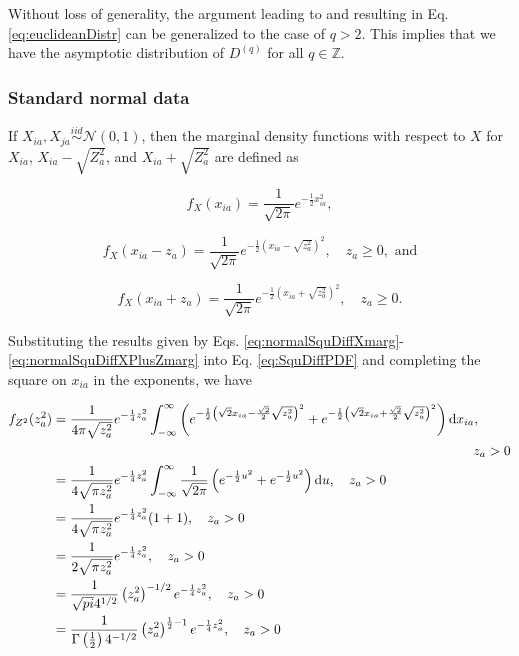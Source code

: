 \documentclass[10pt,letterpaper]{article}\usepackage[]{graphicx}\usepackage[]{color}
\begin{document}
Without loss of generality, the argument leading to and resulting in Eq. \ref{eq:euclideanDistr} can be generalized to the case of $q>2$. This implies that we have the asymptotic distribution of $D^{(q)}$ for all $q \in \mathbb{Z}$.

\subsubsection{Standard normal data}

If $X_{ia},X_{ja} \overset{iid}{\sim} \mathcal{N}(0,1)$, then the marginal density functions with respect to $X$ for $X_{ia}$, $X_{ia} - \sqrt{Z^2_a}$, and $X_{ia} + \sqrt{Z^2_a}$ are defined as

\begin{equation}\label{eq:normalSquDiffXmarg}
f_X(x_{ia}) = \frac{1}{\sqrt{2\pi}} e^{-\frac{1}{2}x^2_{ia}},
\end{equation}

\begin{equation}\label{eq:normalSquDiffXMinusZmarg}
f_X(x_{ia} - z_a) = \frac{1}{\sqrt{2\pi}} e^{-\frac{1}{2}\left(x_{ia} - \sqrt{z^2_a}\right)^2}, \quad z_a \geq 0, \text{ and}
\end{equation}

\begin{equation}\label{eq:normalSquDiffXPlusZmarg}
f_X(x_{ia} + z_a) = \frac{1}{\sqrt{2\pi}} e^{-\frac{1}{2}\left(x_{ia} + \sqrt{z^2_a}\right)^2}, \quad z_a \geq 0.
\end{equation}

Substituting the results given by Eqs. \ref{eq:normalSquDiffXmarg}-\ref{eq:normalSquDiffXPlusZmarg} into Eq. \ref{eq:SquDiffPDF} and completing the square on $x_{ia}$ in the exponents, we have

\begin{equation}\label{eq:normalSquDiffPDF}
\begin{aligned}
f_{Z^2}(z^2_a) &= \frac{1}{4\pi\sqrt{z^2_a}} e^{-\frac{1}{4}z^2_a} \int_{-\infty}^{\infty} \left(e^{-\frac{1}{2}\left(\sqrt{2}x_{ia} - \frac{\sqrt{2}}{2}\sqrt{z^2_a}\right)^2} + e^{-\frac{1}{2}\left(\sqrt{2}x_{ia} + \frac{\sqrt{2}}{2}\sqrt{z^2_a}\right)^2} \right) \text{d}x_{ia}, \\
&\hphantom{= } \hspace{10.8cm} z_a > 0 \\
&= \frac{1}{4\sqrt{\pi z^2_a}} e^{-\frac{1}{4}z^2_a}\int_{-\infty}^{\infty} \frac{1}{\sqrt{2\pi}} \left(e^{-\frac{1}{2}u^2} + e^{-\frac{1}{2}u^2}\right) \text{d}u, \quad z_a > 0 \\
&= \frac{1}{4\sqrt{\pi z^2_a}}e^{-\frac{1}{4}z^2_a}(1 + 1), \quad z_a > 0 \\
&= \frac{1}{2\sqrt{\pi z^2_a}}e^{-\frac{1}{4}z^2_a}, \quad z_a > 0 \\
&= \frac{1}{\sqrt{pi} 4^{1/2}} \left(z^2_a\right)^{-1/2} e^{-\frac{1}{4}z^2_a}, \quad z_a > 0 \\
&= \frac{1}{\Gamma\left(\frac{1}{2}\right) 4^{-1/2}} \left(z^2_a\right)^{\frac{1}{2} - 1} e^{-\frac{1}{4}z^2_a}, \quad z_a > 0
\end{aligned}
\end{equation}
\end{document}
